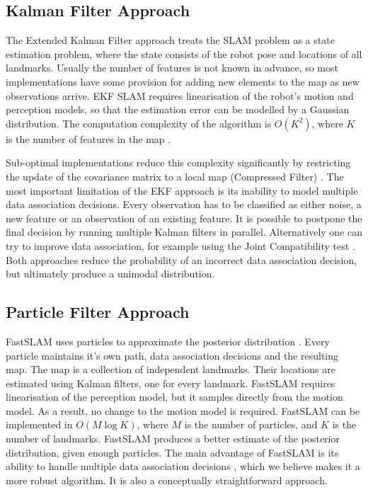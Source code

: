 \subsection{Kalman Filter Approach}
The Extended Kalman Filter approach treats the SLAM problem as a state
estimation problem, where the state consists of the robot pose and
locations of all landmarks. Usually the number of features is not
known in advance, so most implementations have some provision for
adding new elements to the map as new observations arrive. EKF SLAM
requires linearisation of the robot's motion and perception models, so
that the estimation error can be modelled by a Gaussian distribution.
The computation complexity of the algorithm is $O(K^2)$, where $K$ is
the number of features in the map \cite{ekf_slam}.

Sub-optimal implementations reduce this complexity significantly by
restricting the update of the covariance matrix to a local map
(Compressed Filter) \cite{williams:acra2001}. The most important
limitation of the EKF approach is its inability to model multiple data
association decisions. Every observation has to be classified as
either noise, a new feature or an observation of an existing feature.
It is possible to postpone the final decision by running multiple
Kalman filters in parallel. Alternatively one can try to improve data
association, for example using the Joint Compatibility test
\cite{neira01:_data_assoc_stoch_mappin_using}.  Both approaches reduce
the probability of an incorrect data association decision, but
ultimately produce a unimodal distribution.

\subsection{Particle Filter Approach}
FastSLAM uses particles to approximate the posterior distribution
\cite{fastslam}. Every particle maintains it's own path,
data association decisions and the resulting map. The map is a
collection of independent landmarks. Their locations are estimated
using Kalman filters, one for every landmark. FastSLAM requires
linearisation of the perception model, but it samples directly from
the motion model. As a result, no change to the motion model is
required. FastSLAM can be implemented in $O(M\log K)$, where $M$ is
the number of particles, and $K$ is the number of landmarks. FastSLAM
produces a better estimate of the posterior distribution, given enough
particles. The main advantage of FastSLAM is its ability to handle
multiple data association decisions \cite{Montemerlo02d}, which we
believe makes it a more robust algorithm. It is also a conceptually
straightforward approach.

